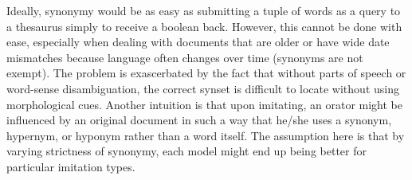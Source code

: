 



Ideally, synonymy would be as easy as submitting a tuple of words as a query to a thesaurus simply to receive a boolean back. However, this cannot be done with ease, especially when dealing with documents that are older or have wide date mismatches because language often changes over time (synonyms are not exempt). The problem is exascerbated by the fact that without parts of speech or word-sense disambiguation, the correct synset is difficult to locate without using morphological cues. %
Another intuition is that upon imitating, an orator might be influenced by an original document in such a way that he/she uses a synonym, hypernym, or hyponym rather than a word itself. The assumption here is that by varying strictness of synonymy, each model might end up being better for particular imitation types.

